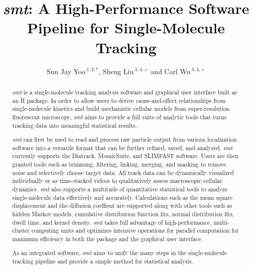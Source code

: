 \documentclass{bioinfo}
\begin{document}

\title[smt]{\textit{smt}: A High-Performance Software Pipeline for Single-Molecule Tracking}
\author[Yoo \textit{et~al}]{Sun Jay Yoo\,$^{1,2,*}$, Sheng Liu\,$^{3,4,\diamond}$ and Carl Wu\,$^{3,4,\diamond}$}
\address{$^{1}$Department of Biomedical Engineering, Johns Hopkins University\\
$^{2}$Department of Computer Science, Johns Hopkins University\\
$^{3}$Department of Molecular Biology \& Genetics, Johns Hopkins University School of Medicine\\
$^{4}$Department of Biology, Johns Hopkins University}



\maketitle

\begin{abstract}
\textit{smt} is a single-molecule tracking analysis software and graphical user interface built as an R package. In order to allow users to derive cause-and-effect relationships from single-molecule kinetics and build mechanistic cellular models from super-resolution fluorescent microscopy, \textit{smt} aims to provide a full suite of analytic tools that turns tracking data into meaningful statistical results. 

\textit{smt} can first be used to read and process raw particle output from various localization software into a versatile format that can be further refined, saved, and analyzed. \textit{smt} currently supports the Diatrack, MosaicSuite, and SLIMFAST software. Users are then granted tools such as trimming, filtering, linking, merging, and masking to remove noise and selectively choose target data. All track data can be dynamically visualized individually or as time-stacked videos to qualitatively assess macroscopic cellular dynamics. \textit{smt} also supports a multitude of quantitative statistical tools to analyze single-molecule data effectively and accurately. Calculations such as the mean square displacement and the diffusion coeffient are supported along with other tools such as hidden Markov models, cumulative distribution function fits, normal distribution fits, dwell time, and kernel density. \textit{smt} takes full advantage of high-performance, multi-cluster computing units and optimizes intensive operations for parallel computation for maximum efficiency in both the package and the graphical user interface.

As an integrated software, \textit{smt} aims to unify the many steps in the single-molecule tracking pipeline and provide a simple method for statistical analysis.
\end{abstract}
\end{document}
